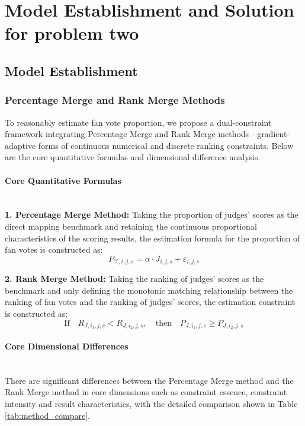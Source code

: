 \documentclass{mcmthesis}
\begin{document}
\section{Model Establishment and Solution for problem two}
\subsection{Model Establishment}
\subsubsection{Percentage Merge and Rank Merge Methods}

To reasonably estimate fan vote proportion, we propose a dual-constraint framework integrating Percentage Merge and Rank Merge methods—gradient-adaptive forms of continuous numerical and discrete ranking constraints. Below are the core quantitative formulas and dimensional difference analysis.

\paragraph{Core Quantitative Formulas}\hfill\\
\noindent\textbf{1. Percentage Merge Method:}
Taking the proportion of judges' scores as the direct mapping benchmark and retaining the continuous proportional characteristics of the scoring results, the estimation formula for the proportion of fan votes is constructed as:
\begin{equation}
P_{\%,i,j,s} = \alpha \cdot J_{i,j,s} + \varepsilon_{i,j,s}
\end{equation}

\noindent\textbf{2. Rank Merge Method:}
Taking the ranking of judges' scores as the benchmark and only defining the monotonic matching relationship between the ranking of fan votes and the ranking of judges' scores, the estimation constraint is constructed as:
\begin{equation}
\text{If} \quad R_{J,i_1,j,s} < R_{J,i_2,j,s}, \quad \text{then} \quad P_{J,i_1,j,s} \geq P_{J,i_2,j,s}
\end{equation}

\paragraph{Core Dimensional Differences}\hfill\\
There are significant differences between the Percentage Merge method and the Rank Merge method in core dimensions such as constraint essence, constraint intensity and result characteristics, with the detailed comparison shown in Table \ref{tab:method_compare}.
\end{document}
